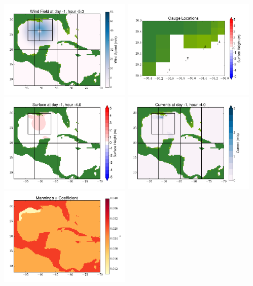 \documentclass[11pt]{article}
\begin{document}
\vskip 10pt 
\includegraphics[width=0.475\textwidth]{frame0043fig9.png}
\includegraphics[width=0.475\textwidth]{frame0043fig10.png}
\vskip 10pt 
\includegraphics[width=0.475\textwidth]{frame0044fig1.png}
\includegraphics[width=0.475\textwidth]{frame0044fig2.png}
\vskip 10pt 
\includegraphics[width=0.475\textwidth]{frame0044fig3.png}
\end{document}
